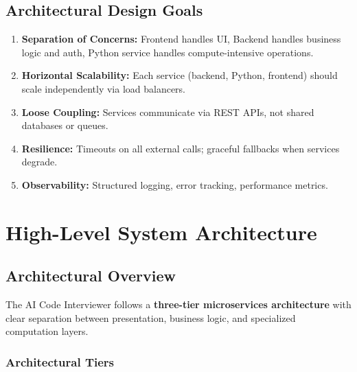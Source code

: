 \documentclass[12pt,a4paper,oneside]{article}
\begin{document}
\subsection{Architectural Design Goals}

\begin{enumerate}
    \item \textbf{Separation of Concerns:} Frontend handles UI, Backend handles business logic and auth, Python service handles compute-intensive operations.
    \item \textbf{Horizontal Scalability:} Each service (backend, Python, frontend) should scale independently via load balancers.
    \item \textbf{Loose Coupling:} Services communicate via REST APIs, not shared databases or queues.
    \item \textbf{Resilience:} Timeouts on all external calls; graceful fallbacks when services degrade.
    \item \textbf{Observability:} Structured logging, error tracking, performance metrics.
\end{enumerate}

\newpage


\section{High-Level System Architecture}

\subsection{Architectural Overview}

The AI Code Interviewer follows a \textbf{three-tier microservices architecture} with clear separation between presentation, business logic, and specialized computation layers.

\subsubsection{Architectural Tiers}
\end{document}
